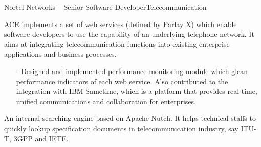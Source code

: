 \documentclass[10pt,a4paper]{moderncv}
\begin{document}
%
\vspace{2ex}
\pagebreak
{}
{Nortel Networks -- Senior Software Developer}{Telecommunication}{}{}{}
{
  ACE implements a set of web services (defined by Parlay X) which enable software developers to use the capability of an underlying telephone network. It aims at integrating telecommunication functions into existing enterprise applications and business processes.
  \begin{itemize}
    \item[-] Designed and implemented performance monitoring module which glean performance indicators of each web service. Also contributed to the integration with IBM Sametime, which is a platform that provides real-time, unified communications and collaboration for enterprises.
  \end{itemize}
}

\vspace*{0.2\baselineskip}
{
    An internal searching engine based on Apache Nutch. It helps technical staffs to quickly lookup specification documents in telecommunication industry, say ITU-T, 3GPP and IETF.
}
\end{document}
